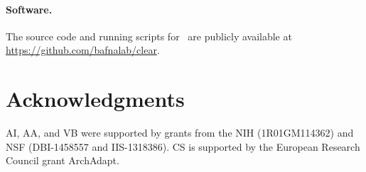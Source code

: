 \paragraph{Software.}
The source code and running scripts for \comale\ are publicly available at \\
\href{https://github.com/bafnalab/clear}{https://github.com/bafnalab/clear}.

\section*{Acknowledgments}
AI, AA, and VB were supported by grants from the NIH (1R01GM114362) and
NSF (DBI-1458557 and IIS-1318386). CS is supported by the European Research 
Council grant ArchAdapt.

